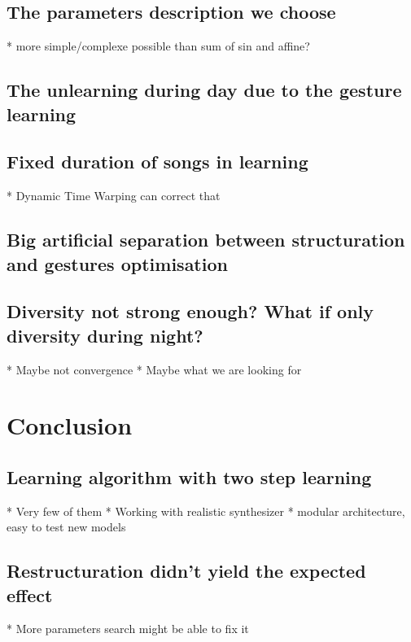 \documentclass{report}
\begin{document}
\section{The parameters description we
choose}\label{the-parameters-description-we-choose}

  * more simple/complexe possible than sum of sin and affine?
\section{The unlearning during day due to the gesture
learning}\label{the-unlearning-during-day-due-to-the-gesture-learning}

\section{Fixed duration of songs in
learning}\label{fixed-duration-of-songs-in-learning}

  * Dynamic Time Warping can correct that
\section{Big artificial separation between structuration and gestures
optimisation}\label{big-artificial-separation-between-structuration-and-gestures-optimisation}

\section{Diversity not strong enough? What if only diversity during
night?}\label{diversity-not-strong-enough-what-if-only-diversity-during-night}

  * Maybe not convergence
  * Maybe what we are looking for
\chapter{Conclusion}\label{conclusion}

\section{Learning algorithm with two step
learning}\label{learning-algorithm-with-two-step-learning}

  * Very few of them
  * Working with realistic synthesizer
  * modular architecture, easy to test new models
\section{Restructuration didn't yield the expected
effect}\label{restructuration-didnt-yield-the-expected-effect}

 * More parameters search might be able to fix it

\printbibliography{}
\end{document}
